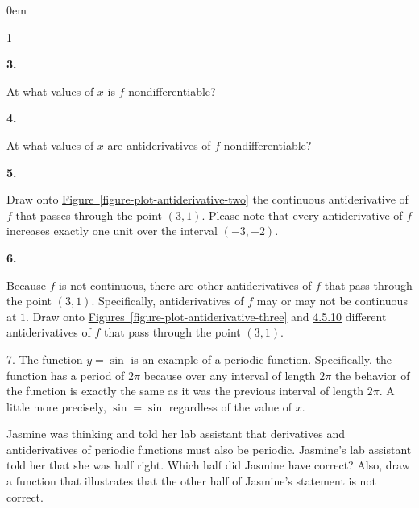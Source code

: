 \documentclass[12pt,]{book}
\theoremstyle{plain}
\theoremstyle{definition}
\numberwithin{equation}{section}
\newenvironment{exercisegroup}%
{\medskip\noindent}%
{\par\bigskip}%
\newlength{\exercisegroupindent}%
\newlength{\exercisegroupitemwidth}%
\newenvironment{exercisegrouplist}%
{\vspace{-\partopsep}%
\begin{adjustwidth}{\exercisegroupindent}{0em}}%
{\end{adjustwidth}%
\vspace{-\partopsep}%
\vspace{\baselineskip}}%
\newenvironment{exercisegroupbycol}[1]%
{\begin{exercisegrouplist}%
\vspace{-\multicolsep}%
\begin{multicols}{#1}%
\setlength{\parindent}{0em}%
\setlength{\exercisegroupitemwidth}{\linewidth}}%
{\end{multicols}%
\vspace{-\multicolsep}%
\end{exercisegrouplist}}%
\newenvironment{exercisegroupitem}[1]%
{\begin{minipage}[t]{\exercisegroupitemwidth}
\vspace{0pt}%
{\bfseries#1}%
\rule{0pt}{\baselineskip}}{\strut%
\end{minipage}%
\hspace{\columnsep}}%
\providecommand\phantomsection{}
\newcommand{\fe}[2]{\mathop{{#1}{\left(#2\right)}}}
\newcommand{\ointerval}[2]{\left(#1,#2\right)}
\newcommand{\point}[2]{\left(#1,#2\right)}
\begin{document}
\begin{exercisegroup}
\begin{exercisegroupbycol}{1}%
\begin{exercisegroupitem}{3. }\phantomsection\hypertarget{exercise-243}{\null}
At what values of \(x\) is \(f\) nondifferentiable?%
\end{exercisegroupitem}%
\par%
\begin{exercisegroupitem}{4. }\phantomsection\hypertarget{exercise-244}{\null}
At what values of \(x\) are antiderivatives of \(f\) nondifferentiable?%
\end{exercisegroupitem}%
\par%
\begin{exercisegroupitem}{5. }\phantomsection\hypertarget{exercise-245}{\null}
Draw onto \hyperref[figure-plot-antiderivative-two]{Figure~\ref*{figure-plot-antiderivative-two}} the continuous antiderivative of \(f\) that passes through the point \(\point{3}{1}\).  Please note that every antiderivative of \(f\) increases exactly one unit over the interval \(\ointerval{-3}{-2}\).%
\end{exercisegroupitem}%
\par%
\begin{exercisegroupitem}{6. }\phantomsection\hypertarget{exercise-246}{\null}
Because \(f\) is not continuous, there are other antiderivatives of \(f\) that pass through the point \(\point{3}{1}\). Specifically, antiderivatives of \(f\) may or may not be continuous at \(1\).  Draw onto \hyperref[figure-plot-antiderivative-three]{Figures~\ref*{figure-plot-antiderivative-three}} and \hyperref[figure-plot-antiderivative-four]{4.5.10} different antiderivatives of \(f\) that pass through the point \(\point{3}{1}\).%
\end{exercisegroupitem}%
\par%
\end{exercisegroupbycol}%
\end{exercisegroup}%
\begin{exerciselist}
\item[7.]\phantomsection\hypertarget{exercise-247}{\null}The function \(y=\fe{\sin}{x}\) is an example of a periodic function.  Specifically, the function has a period of \(2\pi\) because over any interval of length \(2\pi\) the behavior of the function is exactly the same as it was the previous interval of length \(2\pi\).  A little more precisely, \(\fe{\sin}{x+2\pi}=\fe{\sin}{x}\) regardless of the value of \(x\).%
\par
Jasmine was thinking and told her lab assistant that derivatives and antiderivatives of periodic functions must also be periodic.  Jasmine's lab assistant told her that she was half right.  Which half did Jasmine have correct?  Also, draw a function that illustrates that the other half of Jasmine's statement is not correct.%
\par\smallskip
\end{exerciselist}
\end{document}
